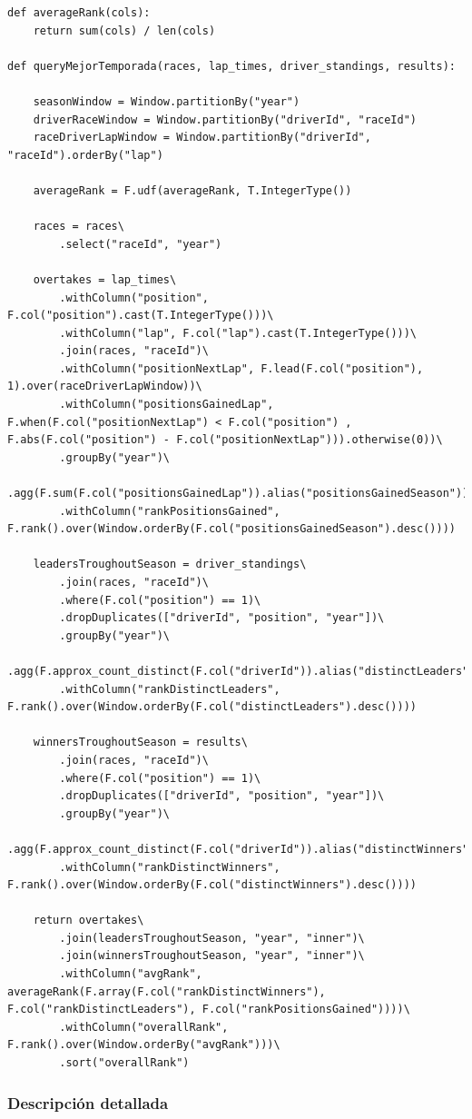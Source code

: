 \documentclass[12pt,twoside,titlepage]{report}
\begin{document}
\begin{lstlisting}
def averageRank(cols):
	return sum(cols) / len(cols)
	
def queryMejorTemporada(races, lap_times, driver_standings, results):
	
	seasonWindow = Window.partitionBy("year")
	driverRaceWindow = Window.partitionBy("driverId", "raceId")
	raceDriverLapWindow = Window.partitionBy("driverId", "raceId").orderBy("lap")
	
	averageRank = F.udf(averageRank, T.IntegerType())
	
	races = races\
		.select("raceId", "year")
	
	overtakes = lap_times\
		.withColumn("position", F.col("position").cast(T.IntegerType()))\
		.withColumn("lap", F.col("lap").cast(T.IntegerType()))\
		.join(races, "raceId")\
		.withColumn("positionNextLap", F.lead(F.col("position"), 1).over(raceDriverLapWindow))\
		.withColumn("positionsGainedLap", F.when(F.col("positionNextLap") < F.col("position") , F.abs(F.col("position") - F.col("positionNextLap"))).otherwise(0))\
		.groupBy("year")\
		.agg(F.sum(F.col("positionsGainedLap")).alias("positionsGainedSeason"))\
		.withColumn("rankPositionsGained", F.rank().over(Window.orderBy(F.col("positionsGainedSeason").desc())))
	
	leadersTroughoutSeason = driver_standings\
		.join(races, "raceId")\
		.where(F.col("position") == 1)\
		.dropDuplicates(["driverId", "position", "year"])\
		.groupBy("year")\
		.agg(F.approx_count_distinct(F.col("driverId")).alias("distinctLeaders"))\
		.withColumn("rankDistinctLeaders", F.rank().over(Window.orderBy(F.col("distinctLeaders").desc())))
	
	winnersTroughoutSeason = results\
		.join(races, "raceId")\
		.where(F.col("position") == 1)\
		.dropDuplicates(["driverId", "position", "year"])\
		.groupBy("year")\
		.agg(F.approx_count_distinct(F.col("driverId")).alias("distinctWinners"))\
		.withColumn("rankDistinctWinners", F.rank().over(Window.orderBy(F.col("distinctWinners").desc())))
	
	return overtakes\
		.join(leadersTroughoutSeason, "year", "inner")\
		.join(winnersTroughoutSeason, "year", "inner")\
		.withColumn("avgRank", averageRank(F.array(F.col("rankDistinctWinners"), F.col("rankDistinctLeaders"), F.col("rankPositionsGained"))))\
		.withColumn("overallRank", F.rank().over(Window.orderBy("avgRank")))\
		.sort("overallRank")
\end{lstlisting}


\subsubsection{Descripción detallada}
\end{document}
